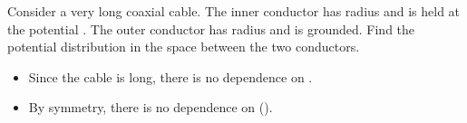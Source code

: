 
\begin{ELexample}{}

Consider a very long coaxial cable. The inner conductor has radius  and is held at the potential . The outer conductor has radius  and is grounded. Find the potential distribution in the space between the two conductors.


\begin{ELsolution}

\begin{itemize}
\tightlist
\item
  Since the cable is long, there is no dependence on .
\item
  By symmetry, there is no dependence on \ELim{\phi} ().
\end{itemize}


\end{ELsolution}

\end{ELexample}


